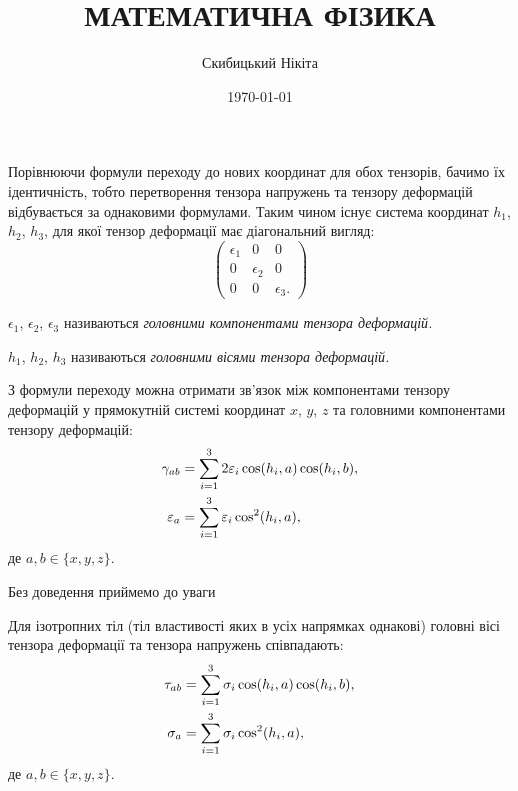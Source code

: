  

 \title{{\Huge МАТЕМАТИЧНА ФІЗИКА}}
 \author{Скибицький Нікіта}
 \date{\today}

 

 

 \tableofcontents

 \setcounter{section}{3}
 \setcounter{subsection}{2}
 \setcounter{subsubsection}{5}
 \setcounter{theorem}{22}
 \setcounter{equation}{56}

Порівнюючи формули переходу до нових координат для обох тензорів, бачимо їх ідентичність, тобто перетворення тензора напружень та тензору деформацій відбувається за однаковими формулами. Таким чином існує система координат $h_1$, $h_2$, $h_3$, для якої тензор деформації має діагональний вигляд: 
\begin{equation}
	\begin{pmatrix}
		\epsilon_1 & 0 & 0 \\
		0 & \epsilon_2 & 0 \\
		0 & 0 & \epsilon_3.
	\end{pmatrix}
\end{equation}

\begin{definition}
 	$\epsilon_1$, $\epsilon_2$, $\epsilon_3$ називаються \it{головними компонентами} тензора деформацій.
\end{definition} 

\begin{definition}
	$h_1$, $h_2$, $h_3$ називаються \it{головними вісями} тензора деформацій.
\end{definition}

З формули переходу можна отримати зв'язок між компонентами тензору деформацій у прямокутній системі координат $x$, $y$, $z$ та головними компонентами тензору деформацій:
\begin{align}
	\gamma_{a b} &= \displaystyle\sum\limits_{i = 1}^3 2 \varepsilon_i \cos (h_i, a) \cos (h_i, b), \\
	\varepsilon_a &= \displaystyle\sum\limits_{i = 1}^3 \varepsilon_i \cos^2(h_i, a),
\end{align}
де $a, b \in \{x, y, z\}$. \medskip

Без доведення приймемо до уваги 

\begin{proposition}
	Для ізотропних тіл (тіл властивості яких в усіх напрямках однакові) головні вісі тензора деформації та тензора напружень співпадають:
	\begin{align}
		\tau_{a b} &= \displaystyle\sum\limits_{i = 1}^3  \sigma_i \cos (h_i, a) \cos (h_i, b), \\
		\sigma_a &= \displaystyle\sum\limits_{i = 1}^3 \sigma_i \cos^2(h_i, a),
	\end{align}
	де $a, b \in \{x, y, z\}$.
\end{proposition}

